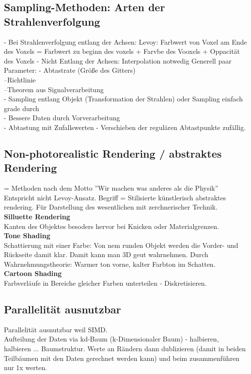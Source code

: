 \documentclass{article}
\begin{document}
\subsection{Sampling-Methoden: Arten der Strahlenverfolgung}
- Bei Strahlenverfolgung entlang der Achsen: Levoy: Farbwert von Voxel am Ende des Voxels = Farbwert zu beginn des voxels + Farvbe des Vooxels + Oppacität des Voxels
- Nicht Entlang der Achsen: Interpolation notwedig
Generell paar Parameter:
- Abtastrate  (Größe des Gitters)\\
--Richtlinie\\
--Theorem aus Signalverarbeitung\\
- Sampling entlang Objekt (Transformation der Strahlen) oder Sampling einfach grade durch\\
- Bessere Daten durch Vorverarbeitung\\
- Abtastung mit Zufallswerten - Verschieben der regulären Abtastpunkte zufällig.\\



\subsection{Non-photorealistic Rendering / abstraktes Rendering }
= Methoden nach dem Motto ''Wir machen was anderes als die Physik'' \\
Entspricht nicht Levoy-Ansatz. Begriff = Stilisierte künstlerisch abstraktes rendering. Für Darstellung des wesentlichen mit zerchnerischer Technik.\\

\noindent \textbf{Silluette Rendering}\\
Kanten des Objektes besoders hervor bei Knicken oder Materialgrenzen.\\

\noindent \textbf{Tone Shading}\\
Schattierung mit einer Farbe: Von nem runden Objekt werden die Vorder- und Rückseite damit klar. Damit kann man 3D geut wahrnehmen. Durch Wahrnehmungstheorie: Warmer ton vorne, kalter Farbton im Schatten.\\

\noindent \textbf{Cartoon Shading}\\
Farbverläufe in Bereiche gleicher Farben unterteilen - Diskretisieren.\\


\subsection{Parallelität ausnutzbar}
Parallelität ausnutzbar weil SIMD.\\
Aufteilung der Daten via kd-Baum (k-Dimensionaler Baum) - halbieren, halbieren ... Baumstruktur. Werte an Rändern dann dublizieren (damit in beiden Teilbäumen mit den Daten gerechnet werden kann) und beim zusammenführen nur 1x werten.
\end{document}
